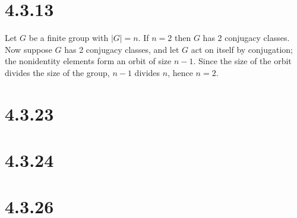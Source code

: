 \documentclass{article}
\begin{document}
\section*{4.3.13}

Let $G$ be a finite group with $|G| = n$. If $n = 2$ then $G$ has 2 conjugacy classes. Now suppose $G$ has 2 conjugacy classes, and let $G$ act on itself by conjugation; the nonidentity elements form an orbit of size $n-1$. Since the size of the orbit divides the size of the group, $n-1$ divides $n$, hence $n = 2$.

\section*{4.3.23}

\section*{4.3.24}

\section*{4.3.26}
\end{document}

